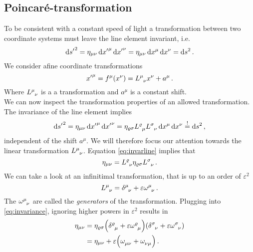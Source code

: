 \subsection{Poincaré-transformation}
To be consistent with a constant speed of light a transformation between two
coordinate systems must leave the line element invariant, i.e.
\begin{equation}
    \dif {s^\prime}^2 = \eta_{\mu\nu}\dif {x^\prime}^\mu\dif
    {x^\prime}^\nu=\eta_{\mu\nu}\dif x^\mu\dif
    x^\nu = \dif s^2\,. \label{eq:invarline}
\end{equation}
We consider afine coordinate transformations
\begin{equation}
    {x^\prime}^\mu= f^\mu(x^\nu)=\tensor{L}{^\mu_\nu}x^\nu+a^\mu\, .
\end{equation}
Where $\tensor{L}{^\mu_\nu}$ is a a  transformation and $a^\mu$
is a constant shift.\\
We can now inspect the transformation properties of an allowed transformation.
The invariance of the line element implies
\begin{equation}
    \dif {s^\prime}^2 = \eta_{\mu\nu}\dif {x^\prime}^\mu\dif
    {x^\prime}^\nu=\eta_{\varrho\sigma}\tensor{L}{^\varrho_\mu}\tensor{L}{^\sigma_\nu}\dif
    x^\mu\dif x^\nu \stackrel{!}{=} \dif s^2\,,
\end{equation}
independent of the shift $a^\mu$. We will therefore focus our attention towards
the linear transformation $\tensor{L}{^\mu_\nu}$. Equation
\eqref{eq:invarline} implies that
\begin{equation}
    \eta_{\mu\nu}=\tensor{L}{^\varrho_\nu}\eta_{\varrho\sigma}\tensor{L}{^\sigma_\nu}\,.\label{eq:invariance}
\end{equation}
We can take a look at an infinitimal transformation, that is up to an order of
$\varepsilon^2$
\begin{equation}
    \tensor{L}{^\mu_\nu}=\tensor{\delta}{^\mu_\nu}
    +\varepsilon\tensor{\omega}{^\mu_\nu}\, .
\end{equation}
The $\tensor{\omega}{^\mu_\nu}$ are called the \emph{generators} of the
transformation. Plugging into \eqref{eq:invariance}, ignoring higher powers in
$\varepsilon^2$ results in
\begin{equation}
    \begin{split}
        \eta_{\mu\nu}&=\eta_{\varrho\sigma}\left(\tensor{\delta}{^\varrho_\mu}
        +\varepsilon\tensor{\omega}{^\varrho_\mu}\right)\left(\tensor{\delta}{^\sigma_\nu}
        +\varepsilon\tensor{\omega}{^\sigma_\nu}\right)\\
        &=
        \eta_{\mu\nu}+\varepsilon\left(\tensor{\omega}{_\mu_\nu}+\tensor{\omega}{_\nu_\mu}\right)\,
        .
    \end{split}
\end{equation}
